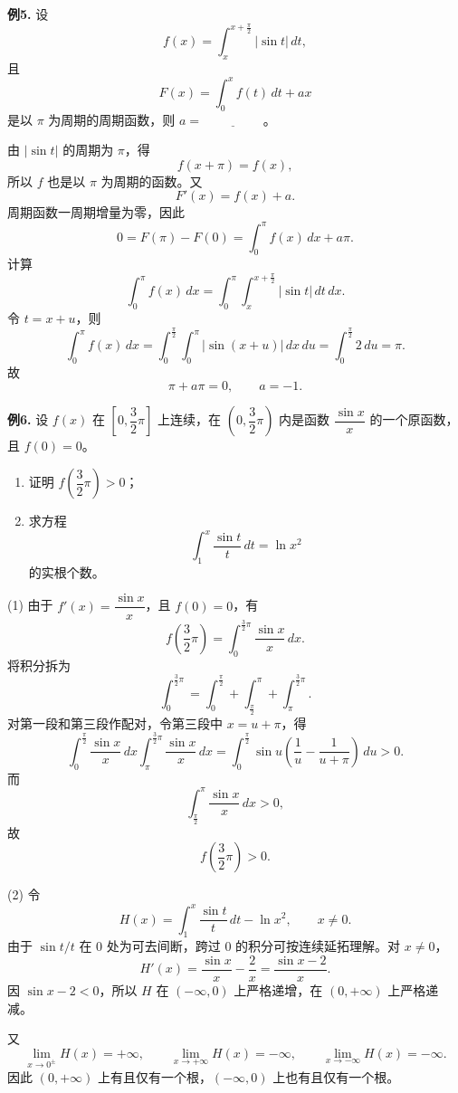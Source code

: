 \begin{problemblock}
\textbf{例5.} 设
\[
f(x)=\int_x^{x+\frac\pi2}|\sin t|\,dt,
\]
且
\[
F(x)=\int_0^x f(t)\,dt+ax
\]
是以 \(\pi\) 为周期的周期函数，则 \(a=\underline{\hspace{2cm}}\)。
\end{problemblock}
\begin{solutionblock}
由 \(|\sin t|\) 的周期为 \(\pi\)，得
\[
f(x+\pi)=f(x),
\]
所以 \(f\) 也是以 \(\pi\) 为周期的函数。又
\[
F'(x)=f(x)+a.
\]
周期函数一周期增量为零，因此
\[
0=F(\pi)-F(0)=\int_0^\pi f(x)\,dx+a\pi.
\]
计算
\[
\int_0^\pi f(x)\,dx
=\int_0^\pi\int_x^{x+\frac\pi2}|\sin t|\,dt\,dx.
\]
令 \(t=x+u\)，则
\[
\int_0^\pi f(x)\,dx
=\int_0^{\frac\pi2}\int_0^\pi|\sin(x+u)|\,dx\,du
=\int_0^{\frac\pi2}2\,du=\pi.
\]
故
\[
\pi+a\pi=0,\qquad a=-1.
\]
\end{solutionblock}

\begin{problemblock}
\textbf{例6.} 设 \(f(x)\) 在 \(\left[0,\dfrac32\pi\right]\) 上连续，在 \(\left(0,\dfrac32\pi\right)\) 内是函数 \(\dfrac{\sin x}{x}\) 的一个原函数，且 \(f(0)=0\)。
\begin{enumerate}[label=(\arabic*), leftmargin=2.2em]
\item 证明 \(f\left(\dfrac32\pi\right)>0\)；
\item 求方程
\[
\int_1^x\frac{\sin t}{t}\,dt=\ln x^2
\]
的实根个数。
\end{enumerate}
\end{problemblock}
\begin{solutionblock}
(1) 由于 \(f'(x)=\dfrac{\sin x}{x}\)，且 \(f(0)=0\)，有
\[
f\left(\frac32\pi\right)
=\int_0^{\frac32\pi}\frac{\sin x}{x}\,dx.
\]
将积分拆为
\[
\int_0^{\frac32\pi}
=\int_0^{\frac\pi2}+\int_{\frac\pi2}^{\pi}+\int_{\pi}^{\frac32\pi}.
\]
对第一段和第三段作配对，令第三段中 \(x=u+\pi\)，得
\[
\int_0^{\frac\pi2}\frac{\sin x}{x}\,dx
\int_{\pi}^{\frac32\pi}\frac{\sin x}{x}\,dx
=\int_0^{\frac\pi2}\sin u\left(\frac1u-\frac1{u+\pi}\right)\,du>0.
\]
而
\[
\int_{\frac\pi2}^{\pi}\frac{\sin x}{x}\,dx>0,
\]
故
\[
f\left(\frac32\pi\right)>0.
\]

(2) 令
\[
H(x)=\int_1^x\frac{\sin t}{t}\,dt-\ln x^2,\qquad x\ne0.
\]
由于 \(\sin t/t\) 在 \(0\) 处为可去间断，跨过 \(0\) 的积分可按连续延拓理解。对 \(x\ne0\)，
\[
H'(x)=\frac{\sin x}{x}-\frac2x=\frac{\sin x-2}{x}.
\]
因 \(\sin x-2<0\)，所以 \(H\) 在 \((-\infty,0)\) 上严格递增，在 \((0,+\infty)\) 上严格递减。

又
\[
\lim_{x\to0^\pm}H(x)=+\infty,\qquad
\lim_{x\to+\infty}H(x)=-\infty,\qquad
\lim_{x\to-\infty}H(x)=-\infty.
\]
因此 \((0,+\infty)\) 上有且仅有一个根，\((-\infty,0)\) 上也有且仅有一个根。
\end{solutionblock}

